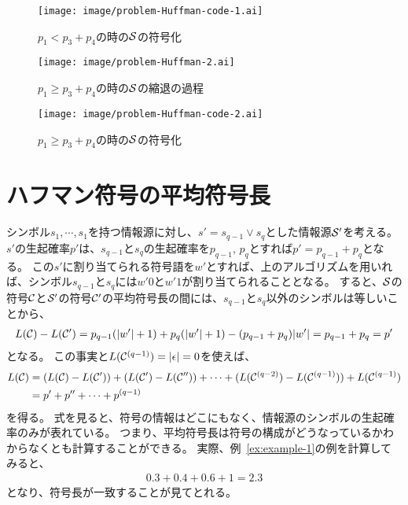 \documentclass[pdflatex, ja=standard, a4paper]{bxjsarticle}
\theoremstyle{definition}
\newcommand{\exref}[1]{例~\ref{#1}}
\begin{document}
\begin{figure}
    \centering
    \texttt{[image: image/problem-Huffman-code-1.ai]}
    \caption{$p_1 < p_3 + p_4$の時の$\mathcal{S}$の符号化}
\end{figure}
\begin{figure}
    \centering
    \texttt{[image: image/problem-Huffman-2.ai]}
    \caption{$p_1 \geq p_3 + p_4$の時の$\mathcal{S}$の縮退の過程}
\end{figure}
\begin{figure}
    \centering
    \texttt{[image: image/problem-Huffman-code-2.ai]}
    \caption{$p_1 \geq p_3 + p_4$の時の$\mathcal{S}$の符号化}
\end{figure}

\section{ハフマン符号の平均符号長} \label{sec:huffman-and-average-cwl}
シンボル$s_1, \cdots, s_1$を持つ情報源に対し、$s' = s_{q - 1} \lor s_q$とした情報源$\mathcal{S}'$を考える。
$s'$の生起確率$p'$は、$s_{q - 1}$と$s_q$の生起確率を$p_{q - 1}$, $p_q$とすれば$p' = p_{q - 1} + p_q$となる。
この$s'$に割り当てられる符号語を$w'$とすれば、上のアルゴリズムを用いれば、シンボル$s_{q - 1}$と$s_q$には$w' 0$と$w' 1$が割り当てられることとなる。
すると、$\mathcal{S}$の符号$\mathcal{C}$と$\mathcal{S}'$の符号$\mathcal{C}'$の平均符号長の間には、$s_{q - 1}$と$s_q$以外のシンボルは等しいことから、
\begin{align*}
    L(\mathcal{C}) - L(\mathcal{C}') = p_{q - 1} (|w'| + 1) + p_q (|w'| + 1) - (p_{q - 1} + p_q) |w'| = p_{q - 1} + p_q = p'
\end{align*}
となる。
この事実と$L(\mathcal{C}^{(q - 1)}) = |\epsilon| = 0$を使えば、
\begin{align} \label{eq:average-cwl}
    \begin{aligned}
        L(\mathcal{C}) &= (L(\mathcal{C}) - L(\mathcal{C}')) + (L(\mathcal{C}') - L(\mathcal{C}'')) + \cdots + (L(\mathcal{C}^{(q - 2)}) - L(\mathcal{C}^{(q - 1)})) + L(\mathcal{C}^{(q - 1)}) \\
                 &= p' + p'' + \cdots + p^{(q - 1)}
    \end{aligned}
\end{align}
を得る。
式を見ると、符号の情報はどこにもなく、情報源のシンボルの生起確率のみが表れている。
つまり、平均符号長は符号の構成がどうなっているかわからなくとも計算することができる。
実際、\exref{ex:example-1}の例を計算してみると、
\begin{align*}
    0.3 + 0.4 + 0.6 + 1 = 2.3
\end{align*}
となり、符号長が一致することが見てとれる。
\end{document}
